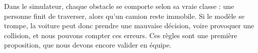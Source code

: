 Dans le simulateur, chaque obstacle se comporte selon sa vraie classe : une personne finit de traverser, alors qu'un camion reste immobile. Si le modèle se trompe, la voiture peut donc prendre une mauvaise décision, voire provoquer une collision, et nous pouvons compter ces erreurs. Ces règles sont une première proposition, que nous devons encore valider en équipe.
